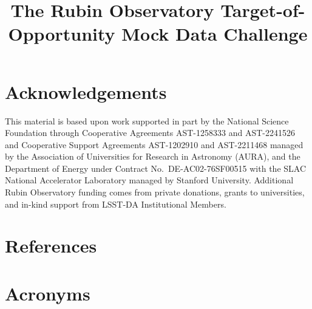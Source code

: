 \documentclass[OPS,lsstdraft,authoryear,toc]{lsstdoc}
\title{The Rubin Observatory Target-of-Opportunity Mock Data Challenge}
\date{\vcsDate}
\begin{document}
\maketitle










\appendix

\section{Acknowledgements}

This material is based upon work supported in part by the National Science Foundation through Cooperative Agreements AST-1258333 and AST-2241526 and Cooperative Support Agreements AST-1202910 and AST-2211468 managed by the Association of Universities for Research in Astronomy (AURA), and the Department of Energy under Contract No.\ DE-AC02-76SF00515 with the SLAC National Accelerator Laboratory managed by Stanford University.
Additional Rubin Observatory funding comes from private donations, grants to universities, and in-kind support from LSST-DA Institutional Members.

\section{References} \label{sec:bib}
\renewcommand{\refname}{} %


\section{Acronyms} \label{sec:acronyms}

\end{document}
